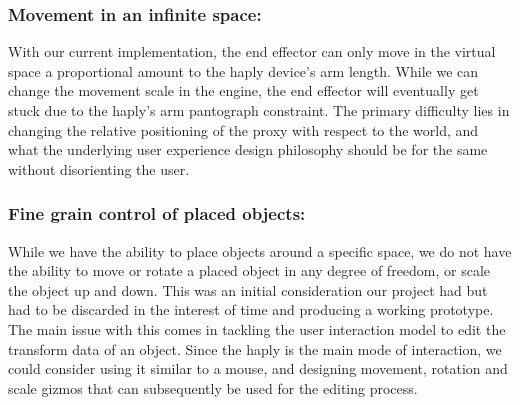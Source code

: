 \subsubsection{Movement in an infinite space:}

With our current implementation, the end effector can only move in the virtual space a proportional amount to the haply device's arm length. While we can change the movement scale in the engine, the end effector will eventually get stuck due to the haply's arm pantograph constraint. The primary difficulty lies in changing the relative positioning of the proxy with respect to the world, and what the underlying user experience design philosophy should be for the same without disorienting the user. 

\subsubsection{Fine grain control of placed objects:}
While we have the ability to place objects around a specific space, we do not have the ability to move or rotate a placed object in any degree of freedom, or scale the object up and down. This was an initial consideration our project had but had to be discarded in the interest of time and producing a working prototype. The main issue with this comes in tackling the user interaction model to edit the transform data of an object. Since the haply is the main mode of interaction, we could consider using it similar to a mouse, and designing movement, rotation and scale gizmos that can subsequently be used for the editing process. 


